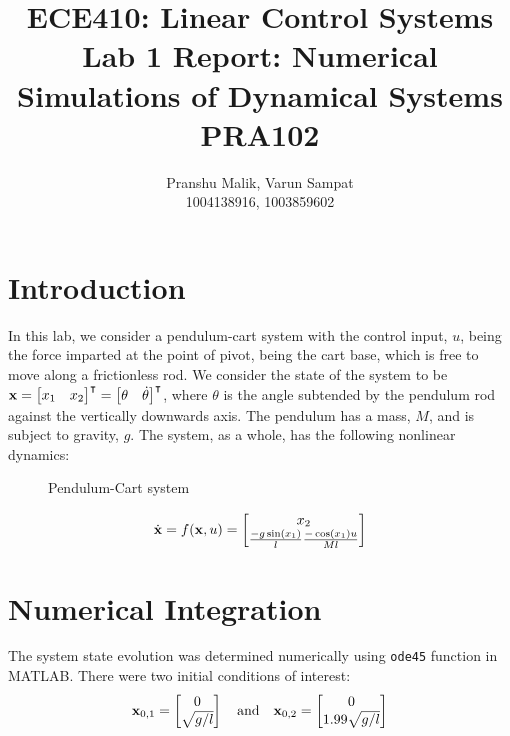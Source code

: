 \documentclass[10pt]{article}
\date{}
\begin{document}
\title{\textbf{\Large{\textsc{ECE410:} Linear Control Systems}} \\ \Large{Lab 1 Report: Numerical Simulations of Dynamical Systems} \\ \textbf{\small{PRA102}}\vspace{-0.3cm}}
\author{Pranshu Malik, Varun Sampat \\ \footnotesize{1004138916}, \footnotesize{1003859602}\vspace{-3cm}}

\maketitle

\section{Introduction}
In this lab, we consider a pendulum-cart system with the control input, $u$, being the force imparted at the point of pivot, being the cart base, which is free to move along a frictionless rod. We consider the state of the system to be $\mathbf{x} = \begin{bmatrix} x_1 & x_2 \end{bmatrix}^\intercal = \begin{bmatrix} \theta & \dot{\theta} \end{bmatrix}^\intercal$, where $\theta$ is the angle subtended by the pendulum rod against the vertically downwards axis. The pendulum has a mass, $M$, and is subject to gravity, $g$. The system, as a whole, has the following nonlinear dynamics:

\begin{figure}[!h]
\centering
\pendcartsimple
\caption{Pendulum-Cart system}
\end{figure}

\begin{equation*}
    \dot{\mathbf{x}} = f(\mathbf{x}, u) = \begin{bmatrix}  x_2 \\ \frac{-g \sin(x_1)}{l} \frac{-\cos(x_1)u}{Ml} \end{bmatrix}
\end{equation*}

\section{Numerical Integration}
The system state evolution was determined numerically using \texttt{ode45} function in MATLAB. There were two initial conditions of interest:
\begin{equation*}
    \mathbf{x}_{0,1} = \begin{bmatrix}  0\\ \sqrt{g/l}  \end{bmatrix}\quad \text{and} \quad \mathbf{x}_{0,2} =  \begin{bmatrix} 0\\1.99 \sqrt{g/l} \end{bmatrix}
\end{equation*}
\end{document}
